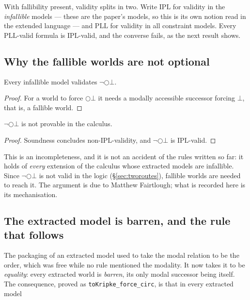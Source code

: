 \documentclass[11pt,a4paper]{article}
\begin{document}
With fallibility present, validity splits in two. Write $\mathrm{IPL}$ for
validity in the \emph{infallible} models --- these are the paper's models,
so this is its own notion read in the extended language --- and
$\mathrm{PLL}$ for validity in all constraint models. Every
$\mathrm{PLL}$-valid formula is $\mathrm{IPL}$-valid, and the converse
fails, as the next result shows.

\subsection{Why the fallible worlds are not optional}

\begin{lemma}
Every infallible model validates $\neg\bigcirc\bot$.
\end{lemma}

\begin{proof}
For a world to force $\bigcirc\bot$ it needs a modally accessible
successor forcing $\bot$, that is, a fallible world.
\end{proof}

\begin{theorem}\label{thm:incomplete}
$\neg\bigcirc\bot$ is not provable in the calculus.
\end{theorem}

\begin{proof}
Soundness concludes non-$\mathrm{IPL}$-validity, and
$\neg\bigcirc\bot$ is $\mathrm{IPL}$-valid.
\end{proof}

This is an incompleteness, and it is not an accident of the rules written
so far: it holds of \emph{every} extension of the calculus whose extracted
models are infallible. Since $\neg\bigcirc\bot$ is not valid in the logic
(\S\ref{sec:tworoutes}), fallible worlds are needed to reach it. The
argument is due to Matthew Fairtlough; what is recorded here is its
mechanisation.

\subsection{The extracted model is barren, and the rule that follows}

The packaging of an extracted model used to take the modal relation to be
the order, which was free while no rule mentioned the modality. It now
takes it to be \emph{equality}: every extracted world is \emph{barren},
its only modal successor being itself. The consequence, proved as
\texttt{toKripke\_force\_circ}, is that in every extracted model
\end{document}
